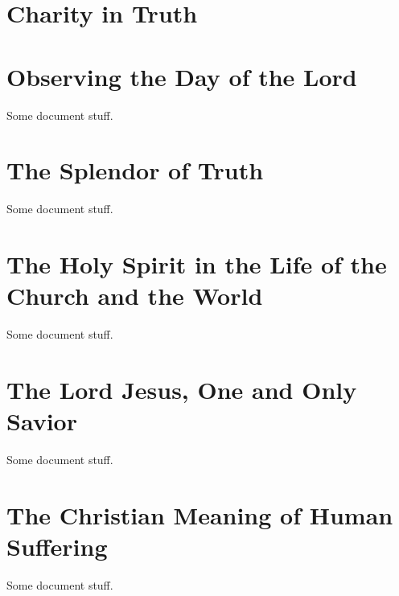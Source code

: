 \documentclass[oneside]{book}
\begin{document}

\chapter{Charity in Truth}




\chapter{Observing the Day of the Lord}

Some document stuff.


\chapter{The Splendor of Truth}

Some document stuff.


\chapter{The Holy Spirit in the Life of the Church and the World}

Some document stuff.


\chapter{The Lord Jesus, One and Only Savior}

Some document stuff.


\chapter{The Christian Meaning of Human Suffering}

Some document stuff.

\end{document}
